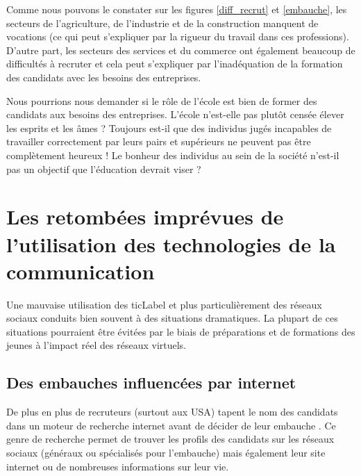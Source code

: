 Comme nous pouvons le constater sur les figures \ref{diff_recrut} et \ref{embauche}, les secteurs de l'agriculture, de l'industrie et de la construction manquent de vocations (ce qui peut s'expliquer par la rigueur du travail dans ces professions). D'autre part, les secteurs des services et du commerce ont également beaucoup de difficultés à recruter et cela peut s'expliquer par l'inadéquation de la formation des candidats avec les besoins des entreprises.

Nous pourrions nous demander si le rôle de l'école est bien de former des candidats aux besoins des entreprises. L'école n'est-elle pas plutôt censée élever les esprits et les âmes ? Toujours est-il que des individus jugés incapables de travailler correctement par leurs pairs et supérieurs ne peuvent pas être complètement heureux ! Le bonheur des individus au sein de la société n'est-il pas un objectif que l'éducation devrait viser ?


\chapter{Les retombées imprévues de l'utilisation des technologies de la communication}
Une mauvaise utilisation des \gls{ticLabel} et plus particulièrement des réseaux sociaux conduits bien souvent à des situations dramatiques. La plupart de ces situations pourraient être évitées par le biais de préparations et de formations des jeunes à l'impact réel des réseaux virtuels.

\section{Des embauches influencées par internet}
De plus en plus de recruteurs (surtout aux USA) tapent le nom des candidats dans un moteur de recherche internet avant de décider de leur embauche \cite{recrutement_internet, recrut_social_network, social_recrut}. Ce genre de recherche permet de trouver les profils des candidats sur les réseaux sociaux (généraux ou spécialisés pour l'embauche) mais également leur site internet ou de nombreuses informations sur leur vie.

